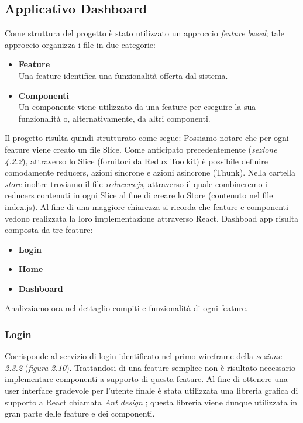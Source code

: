 \subsection{Applicativo Dashboard}
Come struttura del progetto è stato utilizzato un approccio \emph{feature based}; tale approccio organizza i file in due categorie:
\begin{itemize}
  \item \textbf{Feature}\\
  {Una feature identifica una funzionalità offerta dal sistema.}
  \item \textbf{Componenti}\\
  {Un componente viene utilizzato da una feature per eseguire la sua funzionalità o, alternativamente, da altri componenti.}
\end{itemize}
Il progetto risulta quindi strutturato come segue:
\vspace{5mm}
\vspace{5mm}
\noindent Possiamo notare che per ogni feature viene creato un file Slice.\newline 
Come anticipato precedentemente (\emph{sezione 4.2.2}), attraverso lo Slice (fornitoci da Redux Toolkit) è possibile definire comodamente reducers, azioni sincrone e azioni asincrone (Thunk).\newline
Nella cartella \emph{store} inoltre troviamo il file \emph{reducers.js}, attraverso il quale combineremo i reducers contenuti in ogni Slice al fine di creare lo Store (contenuto nel file index.js).\newline
Al fine di una maggiore chiarezza si ricorda che feature e componenti vedono realizzata la loro implementazione attraverso React.\newline
Dashboad app risulta composta da tre feature:
\begin{itemize}
  \item \bf{Login}
  \item \bf{Home}
  \item \bf{Dashboard}
\end{itemize}
Analizziamo ora nel dettaglio compiti e funzionalità di ogni feature.
\subsubsection{Login}
Corrisponde al servizio di login identificato nel primo wireframe della \emph{sezione 2.3.2} (\emph{figura 2.10}).\newline
Trattandosi di una feature semplice non è risultato necessario implementare componenti a supporto di questa feature.\newline
Al fine di ottenere una user interface gradevole per l'utente finale è stata utilizzata una libreria grafica di supporto a React chiamata \emph{Ant design} \cite{documentazione_ant_design}; questa libreria viene dunque utilizzata in gran parte delle feature e dei componenti.

